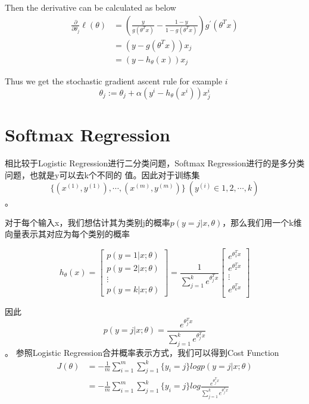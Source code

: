 \documentclass[UTF8]{ctexart}
\begin{document}
Then the derivative can be calculated as below
\begin{align}
\frac{\partial}{\partial \theta_j} \ell(\theta) &= 
(\frac{y}{g(\theta^T x)} - \frac{1-y}{1-g(\theta^Tx)})g^{'}(\theta^T x)
\\
&= (y-g(\theta^Tx))x_j
\\
&= (y-h_{\theta}(x))x_j
\end{align}
\par
Thus we get the stochastic gradient ascent rule for example $i$
\[ \theta_j := \theta_j + \alpha(y^i-h_{\theta}(x^i))x_{j}^i \]

\section{Softmax Regression}
相比较于Logistic Regression进行二分类问题，Softmax Regression进行的是多分类问题，也就是y可以去k个不同的
值。因此对于训练集
\[\{(x^{(1)}, y^{(1)}), \cdots, (x^{(m)}, y^{(m)}) \} \ (y^{(i)} \in {1, 2, \cdots, k})\]。
\par
对于每个输入x，我们想估计其为类别j的概率$p(y=j|x, \theta)$，那么我们用一个k维向量表示其对应为每个类别的概率

\begin{equation}
h_{\theta}(x) = 
\left[ 
\begin{array}{c}
p(y=1|x;\theta) \\
p(y=2|x;\theta) \\
\vdots \\
p(y=k|x;\theta)
\end{array}
\right] 
=
\frac{1}{\sum_{j=1}^k e^{\theta_j^T x}}
\left[
\begin{array}{c}
e^{\theta_1^T x} \\
e^{\theta_2^T x} \\
\vdots \\
e^{\theta_k^T x} \\
\end{array}
\right]
\end{equation}
\par
因此
\[ p(y=j|x;\theta) = \frac{e^{\theta_j^T x}}{\sum_{j=1}^k e^{\theta_j^T x}} \]。
参照Logistic Regression合并概率表示方式，我们可以得到Cost Function
\begin{align}
J(\theta) &= -\frac{1}{m} \sum_{i=1}^m \sum_{j=1}^k \{y_i=j\} logp(y=j|x;\theta) \\
&= -\frac{1}{m} \sum_{i=1}^m \sum_{j=1}^k \{y_i=j\} log \frac{e^{\theta_j^T x}}{\sum_{j=1}^k e^{\theta_j^T x}}
\end{align}
\end{document}

